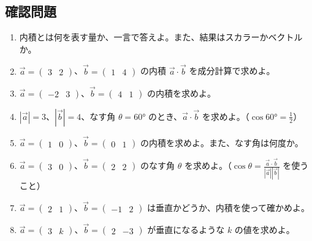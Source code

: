 \documentclass[paper=a4,fleqn,11pt]{jlreq}
\begin{document}
\subsection{確認問題}
\begin{enumerate}
  \item 内積とは何を表す量か、一言で答えよ。また、結果はスカラーかベクトルか。
  \item \(\vec{a}=\begin{pmatrix}3 & 2\end{pmatrix}\)、\(\vec{b}=\begin{pmatrix}1 & 4\end{pmatrix}\) の内積 \(\vec{a}\cdot\vec{b}\) を成分計算で求めよ。
  \item \(\vec{a}=\begin{pmatrix}-2 & 3\end{pmatrix}\)、\(\vec{b}=\begin{pmatrix}4 & 1\end{pmatrix}\) の内積を求めよ。
  \item \(|\vec{a}|=3\)、\(|\vec{b}|=4\)、なす角 \(\theta=60°\) のとき、\(\vec{a}\cdot\vec{b}\) を求めよ。（\(\cos60°=\tfrac{1}{2}\)）
  \item \(\vec{a}=\begin{pmatrix}1 & 0\end{pmatrix}\)、\(\vec{b}=\begin{pmatrix}0 & 1\end{pmatrix}\) の内積を求めよ。また、なす角は何度か。
  \item \(\vec{a}=\begin{pmatrix}3 & 0\end{pmatrix}\)、\(\vec{b}=\begin{pmatrix}2 & 2\end{pmatrix}\) のなす角 \(\theta\) を求めよ。（\(\cos\theta=\frac{\vec{a}\cdot\vec{b}}{|\vec{a}||\vec{b}|}\) を使うこと）
  \item \(\vec{a}=\begin{pmatrix}2 & 1\end{pmatrix}\)、\(\vec{b}=\begin{pmatrix}-1 & 2\end{pmatrix}\) は垂直かどうか、内積を使って確かめよ。
  \item \(\vec{a}=\begin{pmatrix}3 & k\end{pmatrix}\)、\(\vec{b}=\begin{pmatrix}2 & -3\end{pmatrix}\) が垂直になるような \(k\) の値を求めよ。
\end{enumerate}
\end{document}
